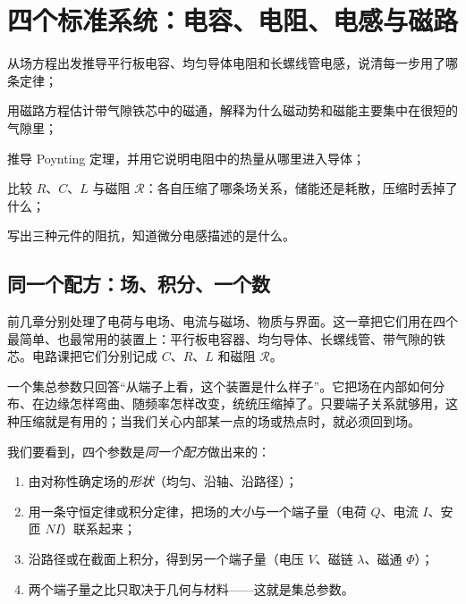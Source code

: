\chapter{四个标准系统：电容、电阻、电感与磁路}\label{ch:systems}

\begin{chapterguide}
\begin{guidegoals}
\item 从场方程出发推导平行板电容、均匀导体电阻和长螺线管电感，说清每一步用了哪条定律；
\item 用磁路方程估计带气隙铁芯中的磁通，解释为什么磁动势和磁能主要集中在很短的气隙里；
\item 推导 Poynting 定理，并用它说明电阻中的热量从哪里进入导体；
\item 比较 $R$、$C$、$L$ 与磁阻 $\mathcal R$：各自压缩了哪条场关系，储能还是耗散，压缩时丢掉了什么；
\item 写出三种元件的阻抗，知道微分电感描述的是什么。
\end{guidegoals}
\end{chapterguide}

\section{同一个配方：场、积分、一个数}\label{sec:systems-recipe}

前几章分别处理了电荷与电场、电流与磁场、物质与界面。这一章把它们用在四个最简单、也最常用的装置上：平行板电容器、均匀导体、长螺线管、带气隙的铁芯。电路课把它们分别记成 $C$、$R$、$L$ 和磁阻 $\mathcal R$。

\begin{intuition}
一个集总参数只回答“从端子上看，这个装置是什么样子”。它把场在内部如何分布、在边缘怎样弯曲、随频率怎样改变，统统压缩掉了。只要端子关系就够用，这种压缩就是有用的；当我们关心内部某一点的场或热点时，就必须回到场。
\end{intuition}

我们要看到，四个参数是\emph{同一个配方}做出来的：

\begin{enumerate}
\item 由对称性确定场的\emph{形状}（均匀、沿轴、沿路径）；
\item 用一条守恒定律或积分定律，把场的\emph{大小}与一个端子量（电荷 $Q$、电流 $I$、安匝 $NI$）联系起来；
\item 沿路径或在截面上积分，得到另一个端子量（电压 $V$、磁链 $\lambda$、磁通 $\Phi$）；
\item 两个端子量之比只取决于几何与材料——这就是集总参数。
\end{enumerate}

